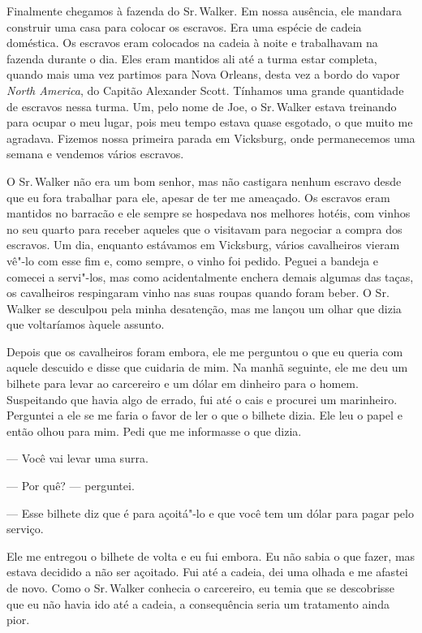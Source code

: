 Finalmente chegamos à fazenda do Sr.\,Walker. Em nossa ausência, ele
mandara construir uma casa para colocar os escravos. Era uma espécie de
cadeia doméstica. Os escravos eram colocados na cadeia à noite e
trabalhavam na fazenda durante o dia. Eles eram mantidos ali até a turma
estar completa, quando mais uma vez partimos para Nova Orleans, desta
vez a bordo do vapor \emph{North America}, do Capitão Alexander Scott.
Tínhamos uma grande quantidade de escravos nessa turma. Um, pelo nome de
Joe, o Sr.\,Walker estava treinando para ocupar o meu lugar, pois meu
tempo estava quase esgotado, o que muito me agradava. Fizemos nossa
primeira parada em Vicksburg, onde permanecemos uma semana e vendemos
vários escravos.

O Sr.\,Walker não era um bom senhor, mas não castigara nenhum escravo
desde que eu fora trabalhar para ele, apesar de ter me ameaçado. Os
escravos eram mantidos no barracão e ele sempre se hospedava nos
melhores hotéis, com vinhos no seu quarto para receber aqueles que o
visitavam para negociar a compra dos escravos. Um dia, enquanto
estávamos em Vicksburg, vários cavalheiros vieram vê"-lo com esse fim e,
como sempre, o vinho foi pedido. Peguei a bandeja e comecei a servi"-los,
mas como acidentalmente enchera demais algumas das taças, os cavalheiros
respingaram vinho nas suas roupas quando foram beber. O Sr.\,Walker se
desculpou pela minha desatenção, mas me lançou um olhar que dizia que
voltaríamos àquele assunto.

Depois que os cavalheiros foram embora, ele me perguntou o que eu queria
com aquele descuido e disse que cuidaria de mim. Na manhã seguinte, ele
me deu um bilhete para levar ao carcereiro e um dólar em dinheiro para o
homem. Suspeitando que havia algo de errado, fui até o cais e procurei
um marinheiro. Perguntei a ele se me faria o favor de ler o que o
bilhete dizia. Ele leu o papel e então olhou para mim. Pedi que me
informasse o que dizia.

--- Você vai levar uma surra.

--- Por quê? --- perguntei.

--- Esse bilhete diz que é para açoitá"-lo e que você tem um dólar para
pagar pelo serviço.

Ele me entregou o bilhete de volta e eu fui embora. Eu não sabia o que
fazer, mas estava decidido a não ser açoitado. Fui até a cadeia, dei uma
olhada e me afastei de novo. Como o Sr.\,Walker conhecia o carcereiro, eu
temia que se descobrisse que eu não havia ido até a cadeia, a
consequência seria um tratamento ainda pior.

